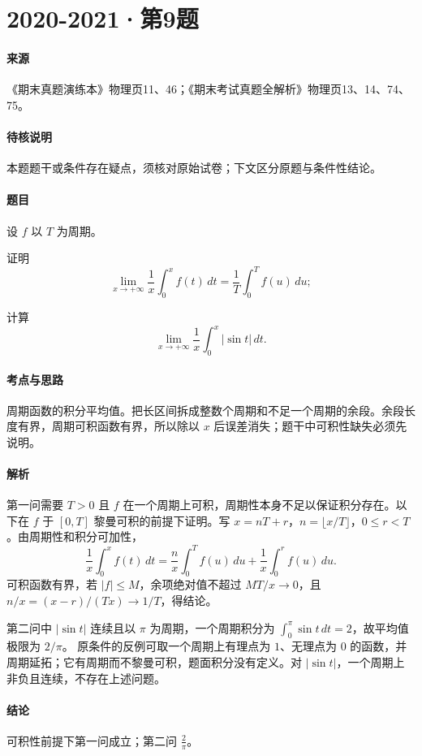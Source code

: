 \documentclass[UTF8,fontset=fandol,12pt,oneside,openany]{ctexrep}
\theoremstyle{definition}
\begin{document}
\par\addvspace{18pt}\noindent\begin{minipage}{\linewidth}
\section{2020-2021·第9题}
\label{exam:11:q15}
\paragraph{来源} 《期末真题演练本》物理页11、46；《期末考试真题全解析》物理页13、14、74、75。
\paragraph{待核说明} 本题题干或条件存在疑点，须核对原始试卷；下文区分原题与条件性结论。
\paragraph{题目}
设 $f$ 以 $T$ 为周期。

证明 \[\lim_{x\to+\infty}\frac1x\int_0^x f(t)\,dt=\frac1T\int_0^T f(u)\,du;\]

计算 \[\lim_{x\to+\infty}\frac1x\int_0^x|\sin t|\,dt.\]
\end{minipage}\par
\paragraph{考点与思路}
周期函数的积分平均值。把长区间拆成整数个周期和不足一个周期的余段。余段长度有界，周期可积函数有界，所以除以 $x$ 后误差消失；题干中可积性缺失必须先说明。
\paragraph{解析}
第一问需要 $T>0$ 且 $f$ 在一个周期上可积，周期性本身不足以保证积分存在。以下在 $f$ 于 $[0,T]$ 黎曼可积的前提下证明。写 $x=nT+r$，$n=\lfloor x/T\rfloor$，$0\le r<T$。由周期性和积分可加性，\[\frac1x\int_0^x f(t)\,dt=\frac nx\int_0^T f(u)\,du+\frac1x\int_0^r f(u)\,du.\]可积函数有界，若 $|f|\le M$，余项绝对值不超过 $MT/x\to0$，且 $n/x=(x-r)/(Tx)\to1/T$，得结论。

第二问中 $|\sin t|$ 连续且以 $\pi$ 为周期，一个周期积分为 $\int_0^\pi\sin t\,dt=2$，故平均值极限为 $2/\pi$。
原条件的反例可取一个周期上有理点为 $1$、无理点为 $0$ 的函数，并周期延拓；它有周期而不黎曼可积，题面积分没有定义。对 $|\sin t|$，一个周期上非负且连续，不存在上述问题。
\paragraph{结论}
可积性前提下第一问成立；第二问 $\frac2\pi$。
\end{document}

